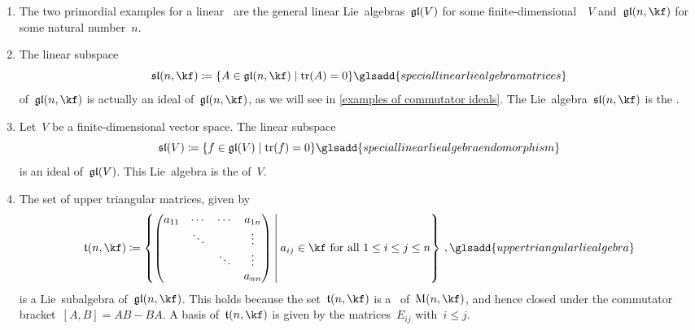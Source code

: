 \begin{examples}
	\label{examples for linear lie algebras}
	\leavevmode
	\begin{enumerate}
		\item
			The two primordial examples for a linear~\liealgebra{$\kf$} are the general linear Lie~algebras~$\mathfrak{gl}(V)$ for some finite-dimensional~\vectorspace{$\kf$}~$V$ and~$\gllie(n, \kf)$ for some natural number~$n$.
		\item
			The linear subspace
			\[
				\sllie(n, \kf)
				\defined
				\{
					A \in \gllie(n, \kf)
				\suchthat
					\tr(A) = 0
				\}
				\glsadd{special linear lie algebra matrices}
			\]
			of~$\gllie(n, \kf)$ is actually an ideal of~$\gllie(n, \kf)$, as we will see in \cref{examples of commutator ideals}.
			The Lie~algebra~$\sllie(n, \kf)$ is the .
		\item
			Let~$V$ be a finite-dimensional vector space.
			The linear subspace
			\[
				\sllie(V)
				\defined
				\{
					f \in \gllie(V)
				\suchthat
					\tr(f) = 0
				\}
				\glsadd{special linear lie algebra endomorphism}
			\]
			is an ideal of~$\mathfrak{gl}(V)$.
			This Lie~algebra is the  of~$V$.
		\item
			The set of upper triangular matrices, given by
			\[
				\trianglie(n, \kf)
				\defined
				\left\{
					\begin{pmatrix}
							a_{11}
						& \cdots
						& \cdots
						& a_{1n}
						\\
							{}
						& \ddots
						& {}
						& \vdots
						\\
							{}
						& {}
						& \ddots
						& \vdots
						\\
							{}
						& {}
						& {}
						& a_{nn}
					\end{pmatrix}
				\suchthat*
					\text{$a_{ij} \in \kf$ for all~$1 \leq i \leq j \leq n$}
				\right\} \,,
				\glsadd{upper triangular lie algebra}
			\]
			is a Lie~subalgebra of~$\gllie(n, \kf)$.
			This holds because the set~$\trianglie(n, \kf)$ is a~{\subalgebra{$\kf$}} of~$\Mat(n, \kf)$, and hence closed under the commutator bracket~$[A,B] = AB - BA$.
			A basis of~$\trianglie(n, \kf)$ is given by the matrices~$E_{ij}$ with~$i \leq j$.


\end{enumerate}
\end{examples}
